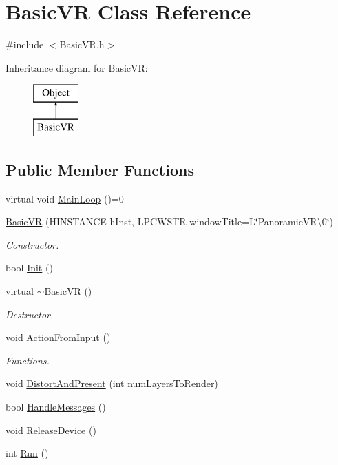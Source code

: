 \hypertarget{class_basic_v_r}{}\section{Basic\+VR Class Reference}
\label{class_basic_v_r}


{\ttfamily \#include $<$Basic\+V\+R.\+h$>$}

Inheritance diagram for Basic\+VR\+:\begin{figure}[H]
\begin{center}
\leavevmode
\includegraphics[height=2.000000cm]{class_basic_v_r}
\end{center}
\end{figure}
\subsection*{Public Member Functions}
\begin{DoxyCompactItemize}
\item 
virtual void \hyperlink{class_basic_v_r_a229f8e7af10029a22ed4738ba08eafd3}{Main\+Loop} ()=0
\item 
\hyperlink{class_basic_v_r_a7ee74cd5d4af3acc033d275c026e05d2}{Basic\+VR} (H\+I\+N\+S\+T\+A\+N\+CE h\+Inst, L\+P\+C\+W\+S\+TR window\+Title=L\char`\"{}Panoramic\+V\+R\textbackslash{}0\char`\"{})
\begin{DoxyCompactList}\small\item\em Constructor. \end{DoxyCompactList}\item 
bool \hyperlink{class_basic_v_r_a55ffc19ef7b92e30a3b173365a29a2ba}{Init} ()
\item 
virtual \hyperlink{class_basic_v_r_ada5417f4e5119c81dd8020c5cd1a0720}{$\sim$\+Basic\+VR} ()
\begin{DoxyCompactList}\small\item\em Destructor. \end{DoxyCompactList}\item 
void \hyperlink{class_basic_v_r_a3c5ef352017729bbd5646fa7a24367e2}{Action\+From\+Input} ()
\begin{DoxyCompactList}\small\item\em Functions. \end{DoxyCompactList}\item 
void \hyperlink{class_basic_v_r_aeff1e4ec95030046365b0804379890f7}{Distort\+And\+Present} (int num\+Layers\+To\+Render)
\item 
bool \hyperlink{class_basic_v_r_a155d1191d162ac1575ee6eb199ee7781}{Handle\+Messages} ()
\item 
void \hyperlink{class_basic_v_r_a0e7d89bc894e137c2bc67ae72ecba8ff}{Release\+Device} ()
\item 
int \hyperlink{class_basic_v_r_ab2068ad6695eabb935e83fa1dd4cdc8d}{Run} ()
\end{DoxyCompactItemize}
